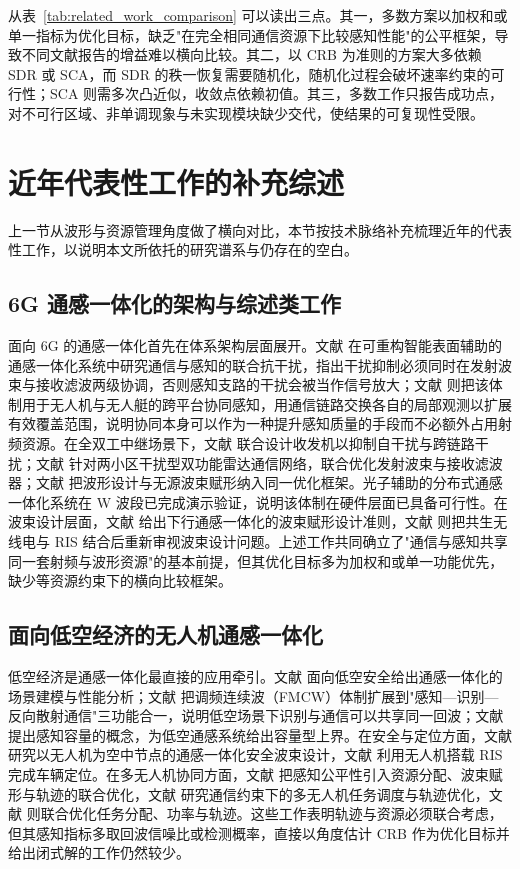从表~\ref{tab:related_work_comparison} 可以读出三点。其一，多数方案以加权和或单一指标为优化目标，缺乏"在完全相同通信资源下比较感知性能"的公平框架，导致不同文献报告的增益难以横向比较。其二，以 CRB 为准则的方案大多依赖 SDR 或 SCA，而 SDR 的秩一恢复需要随机化，随机化过程会破坏速率约束的可行性；SCA 则需多次凸近似，收敛点依赖初值。其三，多数工作只报告成功点，对不可行区域、非单调现象与未实现模块缺少交代，使结果的可复现性受限。

\section{近年代表性工作的补充综述}
\label{sec:related_supplement}
上一节从波形与资源管理角度做了横向对比，本节按技术脉络补充梳理近年的代表性工作，以说明本文所依托的研究谱系与仍存在的空白。

\subsection{6G 通感一体化的架构与综述类工作}
面向 6G 的通感一体化首先在体系架构层面展开。文献\cite{jiao2026communicat} 在可重构智能表面辅助的通感一体化系统中研究通信与感知的联合抗干扰，指出干扰抑制必须同时在发射波束与接收滤波两级协调，否则感知支路的干扰会被当作信号放大；文献\cite{zhang2026uavusvcoll} 则把该体制用于无人机与无人艇的跨平台协同感知，用通信链路交换各自的局部观测以扩展有效覆盖范围，说明协同本身可以作为一种提升感知质量的手段而不必额外占用射频资源。在全双工中继场景下，文献\cite{he2022jointtransce} 联合设计收发机以抑制自干扰与跨链路干扰；文献\cite{li2022jointtransmi} 针对两小区干扰型双功能雷达通信网络，联合优化发射波束与接收滤波器；文献\cite{wang2021jointwavefor} 把波形设计与无源波束赋形纳入同一优化框架。光子辅助的分布式通感一体化系统在 W 波段已完成演示验证\cite{jia2024demonstratio}，说明该体制在硬件层面已具备可行性。在波束设计层面，文献\cite{ruiqi2026downlinkbeam} 给出下行通感一体化的波束赋形设计准则，文献\cite{wang2025integratedse} 则把共生无线电与 RIS 结合后重新审视波束设计问题。上述工作共同确立了"通信与感知共享同一套射频与波形资源"的基本前提，但其优化目标多为加权和或单一功能优先，缺少等资源约束下的横向比较框架。

\subsection{面向低空经济的无人机通感一体化}
低空经济是通感一体化最直接的应用牵引。文献\cite{ren2026integratedse} 面向低空安全给出通感一体化的场景建模与性能分析；文献\cite{zeng2026fmcwenabledi} 把调频连续波（FMCW）体制扩展到"感知—识别—反向散射通信"三功能合一，说明低空场景下识别与通信可以共享同一回波；文献\cite{wan2025sensingcapac} 提出感知容量的概念，为低空通感系统给出容量型上界。在安全与定位方面，文献\cite{chen2024securebeamfo} 研究以无人机为空中节点的通感一体化安全波束设计，文献\cite{li2025vehicleposit} 利用无人机搭载 RIS 完成车辆定位。在多无人机协同方面，文献\cite{luo2026sensingfairn} 把感知公平性引入资源分配、波束赋形与轨迹的联合优化，文献\cite{wang2026multiuavcoop} 研究通信约束下的多无人机任务调度与轨迹优化，文献\cite{wang2026jointoptimiz} 则联合优化任务分配、功率与轨迹。这些工作表明轨迹与资源必须联合考虑，但其感知指标多取回波信噪比或检测概率，直接以角度估计 CRB 作为优化目标并给出闭式解的工作仍然较少。

